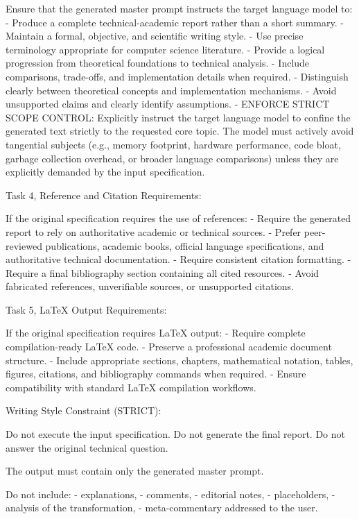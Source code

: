 \documentclass[11pt]{report}
\begin{document}
\begin{PromptVerbatim}
Ensure that the generated master prompt instructs the target language model
to:
- Produce a complete technical-academic report rather than a short summary.
- Maintain a formal, objective, and scientific writing style.
- Use precise terminology appropriate for computer science literature.
- Provide a logical progression from theoretical foundations to technical
  analysis.
- Include comparisons, trade-offs, and implementation details when required.
- Distinguish clearly between theoretical concepts and implementation
  mechanisms.
- Avoid unsupported claims and clearly identify assumptions.
- ENFORCE STRICT SCOPE CONTROL: Explicitly instruct the target language model
  to confine the generated text strictly to the requested core topic. The model
  must actively avoid tangential subjects (e.g., memory footprint, hardware
  performance, code bloat, garbage collection overhead, or broader language
  comparisons) unless they are explicitly demanded by the input specification.

Task 4, Reference and Citation Requirements:

If the original specification requires the use of references:
- Require the generated report to rely on authoritative academic or technical
  sources.
- Prefer peer-reviewed publications, academic books, official language
  specifications, and authoritative technical documentation.
- Require consistent citation formatting.
- Require a final bibliography section containing all cited resources.
- Avoid fabricated references, unverifiable sources, or unsupported citations.

Task 5, LaTeX Output Requirements:

If the original specification requires LaTeX output:
- Require complete compilation-ready LaTeX code.
- Preserve a professional academic document structure.
- Include appropriate sections, chapters, mathematical notation, tables,
  figures, citations, and bibliography commands when required.
- Ensure compatibility with standard LaTeX compilation workflows.

Writing Style Constraint (STRICT):

Do not execute the input specification.
Do not generate the final report.
Do not answer the original technical question.

The output must contain only the generated master prompt.

Do not include:
- explanations,
- comments,
- editorial notes,
- placeholders,
- analysis of the transformation,
- meta-commentary addressed to the user.


\end{PromptVerbatim}
\end{document}
